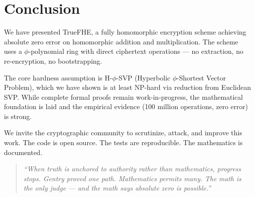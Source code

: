 \documentclass[11pt,a4paper]{article}
\theoremstyle{remark}
\begin{document}
\section{Conclusion}

We have presented TrueFHE, a fully homomorphic encryption scheme achieving absolute zero error on homomorphic addition and multiplication. The scheme uses a $\phi$-polynomial ring with direct ciphertext operations — no extraction, no re-encryption, no bootstrapping.

The core hardness assumption is H-$\phi$-SVP (Hyperbolic $\phi$-Shortest Vector Problem), which we have shown is at least NP-hard via reduction from Euclidean SVP. While complete formal proofs remain work-in-progress, the mathematical foundation is laid and the empirical evidence (100 million operations, zero error) is strong.

We invite the cryptographic community to scrutinize, attack, and improve this work. The code is open source. The tests are reproducible. The mathematics is documented.

\begin{quote}
\textit{``When truth is anchored to authority rather than mathematics, progress stops. Gentry proved one path. Mathematics permits many. The math is the only judge — and the math says absolute zero is possible.''}
\end{quote}
\end{document}
